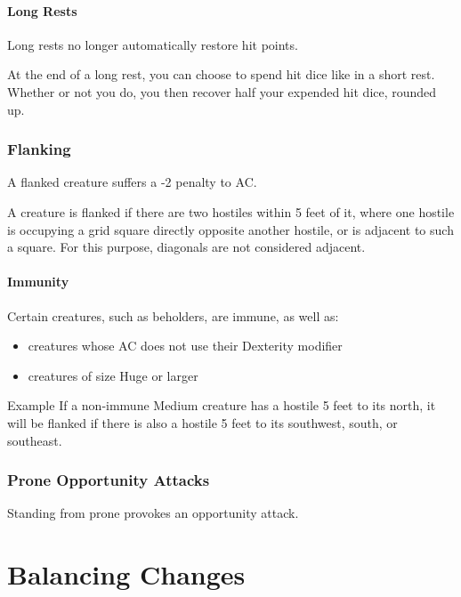 \documentclass[letterpaper,twocolumn,openany,nodeprecatedcode]{dndbook}
\begin{document}
\subsubsection{Long Rests}
Long rests no longer automatically restore hit points.

At the end of a long rest, you can choose to spend hit dice like in a short rest. Whether or not you do, you then recover half your expended hit dice, rounded up.

\subsection{Flanking}

A flanked creature suffers a -2 penalty to AC.

A creature is flanked if there are two hostiles within 5 feet of it, where one hostile is occupying a grid square directly opposite another hostile, or is adjacent to such a square. For this purpose, diagonals are not considered adjacent.

\subsubsection{Immunity}
Certain creatures, such as beholders, are immune, as well as:
\begin{itemize}
    \item creatures whose AC does not use their Dexterity modifier
    \item creatures of size Huge or larger
\end{itemize}

\begin{DndComment}{Example}
If a non-immune Medium creature has a hostile 5 feet to its north, it will be flanked if there is also a hostile 5 feet to its southwest, south, or southeast.
\end{DndComment}

\subsection{Prone Opportunity Attacks}
Standing from prone provokes an opportunity attack.












\chapter{Balancing Changes}
\end{document}
